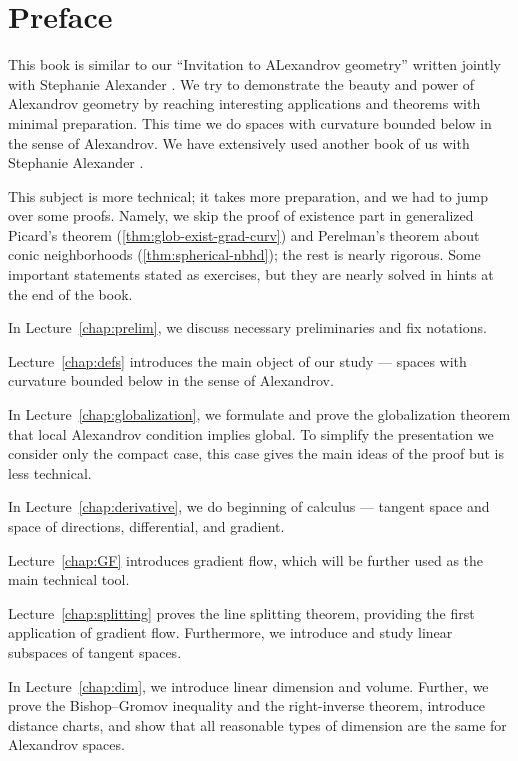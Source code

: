 \chapter*{Preface}

This book is similar to our ``Invitation to ALexandrov geometry'' written jointly with Stephanie Alexander \cite{alexander-kapovitch-petrunin-2019}.
We try to demonstrate the beauty and power of Alexandrov geometry by reaching interesting applications and theorems with minimal preparation.
This time we do spaces with curvature bounded below in the sense of Alexandrov.
We have extensively used another book of us with Stephanie Alexander \cite{alexander-kapovitch-petrunin2024}.

This subject is more technical; it takes more preparation, and we had to jump over some proofs.
Namely, we skip the proof of existence part in generalized Picard's theorem (\ref{thm:glob-exist-grad-curv})
and Perelman's theorem about conic neighborhoods (\ref{thm:spherical-nbhd});
the rest is nearly rigorous.
Some important statements stated as exercises, but they are nearly solved in hints at the end of the book.

\medskip 

In Lecture~\ref{chap:prelim}, we discuss necessary preliminaries and fix notations.

Lecture~\ref{chap:defs} introduces the main object of our study --- spaces with curvature bounded below in the sense of Alexandrov.

In Lecture~\ref{chap:globalization}, we formulate and prove the globalization theorem that local Alexandrov condition implies global.
To simplify the presentation we consider only the compact case, this case gives the main ideas of the proof but is less technical.

In Lecture~\ref{chap:derivative}, we do beginning of calculus --- tangent space and space of directions, differential, and gradient.

Lecture~\ref{chap:GF} introduces gradient flow, which will be further used as the main technical tool.

Lecture~\ref{chap:splitting} proves the line splitting theorem, providing the first application of gradient flow.
Furthermore, we introduce and study  linear subspaces of tangent spaces.

In Lecture~\ref{chap:dim}, we introduce linear dimension and volume.
Further, we prove the Bishop--Gromov inequality and the right-inverse theorem,
introduce  distance charts, and show that all reasonable types of dimension are the 
same for Alexandrov spaces.


